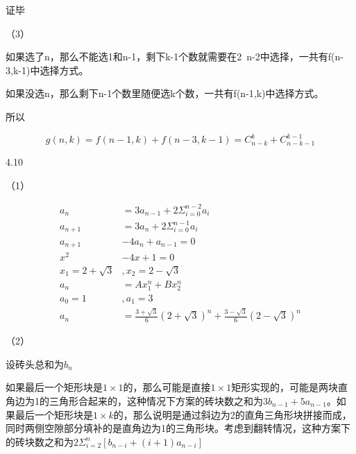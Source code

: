 \documentclass[a4paper]{article}
\begin{document}
\begin{enumerate}
\begin{solution}
证毕

（3）

 如果选了n，那么不能选1和n-1，剩下k-1个数就需要在2~n-2中选择，一共有f(n-3,k-1)中选择方式。
 
 如果没选n，那么剩下n-1个数里随便选k个数，一共有f(n-1,k)中选择方式。
 
 所以
 
$$
g(n,k) = f(n-1,k)+ f(n-3,k-1) = C_{n-k}^k + C_{n-k-1}^{k-1}
$$

\end{solution}


4.10

\begin{solution}

（1）


\begin{align}
    a_n &= 3a_{n-1} + 2\Sigma_{i=0}^{n-2}a_i\\
    a_{n+1} &= 3a_{n} + 2\Sigma_{i=0}^{n-1}a_i\\
    a_{n+1} &-4a_{n}+a_{n-1} = 0\\
    x^2 &- 4x+1=0\\
    x_1=2+\sqrt{3}&, x_2=2-\sqrt{3}\\
    a_n &= Ax_1^n+Bx_2^n\\
    a_0=1 &,a_1=3\\
    a_n &= \frac{3+\sqrt{3}}{6}(2+\sqrt{3})^n + \frac{3-\sqrt{3}}{6}(2-\sqrt{3})^n 
\end{align}


（2）

设砖头总和为$b_n$

如果最后一个矩形块是$1\times 1$的，那么可能是直接$1 \times 1$矩形实现的，可能是两块直角边为1的三角形合起来的，这种情况下方案的砖块数之和为$3b_{n-1}+5a_{n-1}$。如果最后一个矩形块是$1\times k$的，那么说明是通过斜边为2的直角三角形块拼接而成，同时两侧空隙部分填补的是直角边为1的三角形块。考虑到翻转情况，这种方案下的砖块数之和为$2\Sigma_{i=2}^n[b_{n-i}+(i+1)a_{n-i}]$


\end{solution}
\end{enumerate}
\end{document}
